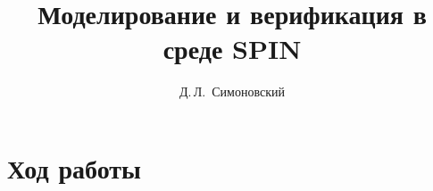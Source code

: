 \documentclass{itmo-report}
\title{Моделирование и верификация в среде SPIN}
\author{Д.\,Л.~Симоновский}
\begin{document}
\maketitle
\tableofcontents


\section{Ход работы}






\clearpage

\end{document}
